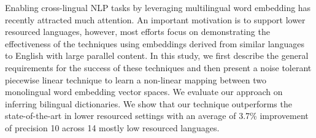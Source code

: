 Enabling cross-lingual NLP tasks by leveraging multilingual word embedding has recently attracted much attention. An important motivation is to support lower resourced languages, however, most efforts focus on demonstrating the effectiveness of the techniques using embeddings derived from similar languages to English with large parallel content. In this study, we first describe the general requirements for the success of these techniques and then present a noise tolerant piecewise linear technique to learn a non-linear mapping between two monolingual word embedding vector spaces. We evaluate our approach on inferring bilingual dictionaries. We show that our technique outperforms the state-of-the-art in lower resourced settings with an average of 3.7\% improvement of precision \@10 across 14 mostly low resourced languages.